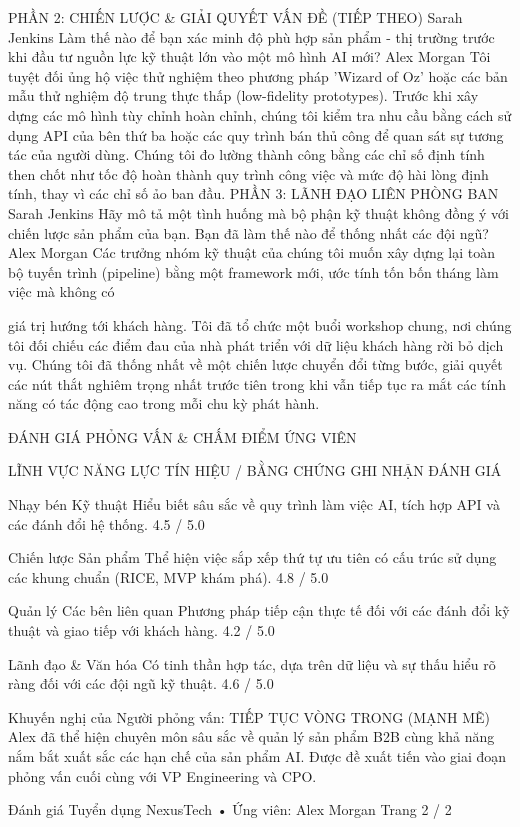 \documentclass[12pt]{article}
\begin{document}
PHẦN 2: CHIẾN LƯỢC \& GIẢI QUYẾT VẤN ĐỀ (TIẾP THEO)
Sarah Jenkins
Làm thế nào để bạn xác minh độ phù hợp sản phẩm - thị trường trước khi đầu tư nguồn lực kỹ thuật lớn vào một mô hình AI mới?
Alex Morgan
Tôi tuyệt đối ủng hộ việc thử nghiệm theo phương pháp 'Wizard of Oz' hoặc các bản mẫu thử nghiệm độ trung thực thấp (low-fidelity prototypes). Trước khi xây dựng các mô hình tùy chỉnh hoàn chỉnh, chúng tôi kiểm tra nhu cầu bằng cách sử dụng API của bên thứ ba hoặc các quy trình bán thủ công để quan sát sự tương tác của người dùng. Chúng tôi đo lường thành công bằng các chỉ số định tính then chốt như tốc độ hoàn thành quy trình công việc và mức độ hài lòng định tính, thay vì các chỉ số ảo ban đầu.
PHẦN 3: LÃNH ĐẠO LIÊN PHÒNG BAN
Sarah Jenkins
Hãy mô tả một tình huống mà bộ phận kỹ thuật không đồng ý với chiến lược sản phẩm của bạn. Bạn đã làm thế nào để thống nhất các đội ngũ?
Alex Morgan
Các trưởng nhóm kỹ thuật của chúng tôi muốn xây dựng lại toàn bộ tuyến trình (pipeline) bằng một framework mới, ước tính tốn bốn tháng làm việc mà không có

giá trị hướng tới khách hàng. Tôi đã tổ chức một buổi workshop chung, nơi chúng tôi đối chiếu các điểm đau của nhà phát triển với dữ liệu khách hàng rời bỏ dịch vụ. Chúng tôi đã thống nhất về một chiến lược chuyển đổi từng bước, giải quyết các nút thắt nghiêm trọng nhất trước tiên trong khi vẫn tiếp tục ra mắt các tính năng có tác động cao trong mỗi chu kỳ phát hành.

ĐÁNH GIÁ PHỎNG VẤN \& CHẤM ĐIỂM ỨNG VIÊN

LĨNH VỰC NĂNG LỰC
TÍN HIỆU / BẰNG CHỨNG GHI NHẬN
ĐÁNH GIÁ

Nhạy bén Kỹ thuật
Hiểu biết sâu sắc về quy trình làm việc AI, tích hợp API và các đánh đổi hệ thống.
4.5 / 5.0

Chiến lược Sản phẩm
Thể hiện việc sắp xếp thứ tự ưu tiên có cấu trúc sử dụng các khung chuẩn (RICE, MVP khám phá).
4.8 / 5.0

Quản lý Các bên liên quan
Phương pháp tiếp cận thực tế đối với các đánh đổi kỹ thuật và giao tiếp với khách hàng.
4.2 / 5.0

Lãnh đạo \& Văn hóa
Có tinh thần hợp tác, dựa trên dữ liệu và sự thấu hiểu rõ ràng đối với các đội ngũ kỹ thuật.
4.6 / 5.0

Khuyến nghị của Người phỏng vấn: TIẾP TỤC VÒNG TRONG (MẠNH MẼ)
Alex đã thể hiện chuyên môn sâu sắc về quản lý sản phẩm B2B cùng khả năng nắm bắt xuất sắc các hạn chế của sản phẩm AI. Được đề xuất tiến vào giai đoạn phỏng vấn cuối cùng với VP Engineering và CPO.

Đánh giá Tuyển dụng NexusTech • Ứng viên: Alex Morgan
Trang 2 / 2
\end{document}
